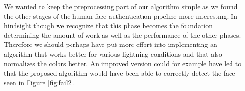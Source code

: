 
We wanted to keep the preprocessing part of our algorithm simple as we found the other stages of the human face authentication pipeline more interesting. In hindsight though we recognize that this phase becomes the foundation determining the amount of work as well as the performance of the other phases. Therefore we should perhaps have put more effort into implementing an algorithm that works better for various lightning conditions and that also normalizes the colors better. An improved version could for example have led to that the proposed algorithm would have been able to correctly detect the face seen in Figure \ref{fig:fail2}. 











